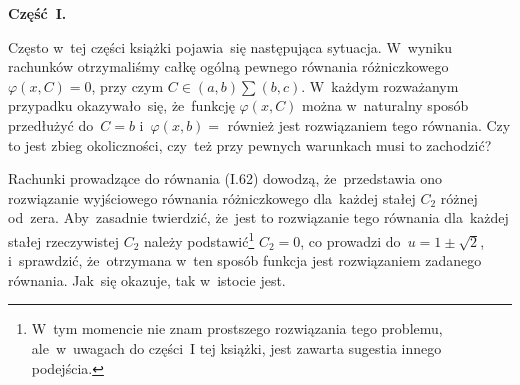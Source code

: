 \documentclass[a4paper,11pt]{article}
\begin{document}










\newpage


\vspace{0em}



\vspace{0em}


\noindent
\textbf{Część~I.}



\noindent
Często w~tej części książki pojawia~się następująca sytuacja.
W~wyniku rachunków otrzymaliśmy całkę ogólną pewnego równania
różniczkowego $\varphi( x, C ) = 0$, przy czym
$C \in ( a, b ) \sum ( b, c )$. W~każdym rozważanym przypadku
okazywało~się, że~funkcję $\varphi( x, C )$ można w~naturalny sposób
przedłużyć do~$C = b$ i~$\varphi( x, b ) = $ również jest rozwiązaniem
tego równania. Czy to jest zbieg okoliczności, czy~też przy pewnych
warunkach musi to zachodzić? \Prze

\vspace{\spaceThree}






\vspace{0em}


\noindent
{} \Dok

\vspace{\spaceFour}





\noindent
{} Rachunki prowadzące do równania (I.62) dowodzą,
że~przedstawia ono rozwiązanie wyjściowego równania różniczkowego
dla~każdej stałej $C_{ 2 }$ różnej od~zera. Aby~zasadnie twierdzić,
że~jest to rozwiązanie tego równania dla~każdej stałej rzeczywistej
$C_{ 2 }$ należy podstawić\footnote{W~tym momencie nie znam prostszego
  rozwiązania tego problemu, ale~w~uwagach do części~I tej książki,
  jest zawarta sugestia innego podejścia.} $C_{ 2 } = 0$, co prowadzi
do~$u = 1 \pm \sqrt{2}$, i~sprawdzić, że~otrzymana w~ten sposób
funkcja jest rozwiązaniem zadanego równania. Jak~się okazuje, tak
w~istocie jest.
\end{document}
